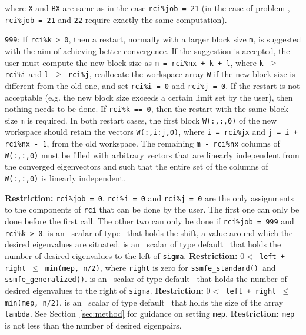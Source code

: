 \begin{description}
\begin{description}
where {\tt X} and {\tt BX} are same as in 
the case {\tt rci\%job = 21}
(in the case of problem ,
{\tt rci\%job = 21} and {\tt 22} 
require exactly the same computation).
%
\item
{\tt 999}: 
If {\tt rci\%k > 0}, then
a restart, normally with a larger block size {\tt m},
is suggested with the aim of achieving better convergence.
If the suggestion is accepted, the user must compute
the new block size as {\tt m = rci\%nx + k + l},
where {\tt k $\ge$ rci\%i} and {\tt l $\ge$ rci\%j},
reallocate the workspace array {\tt W}
if the new block size is different from the old one,
and set {\tt rci\%i = 0} and {\tt rci\%j = 0}.
If the restart is not acceptable
(e.g. the new block size exceeds a certain limit set by the user), 
then nothing needs to be done.
If {\tt rci\%k == 0}, then
the restart with the same block size {\tt m} is required.
In both restart cases,
the first block {\tt W(:,:,0)} of the new
workspace should retain the vectors 
{\tt W(:,i:j,0)},
where {\tt i = rci\%jx} and {\tt j = i + rci\%nx - 1},
from the old workspace.
The remaining {\tt m - rci\%nx} columns of {\tt W(:,:,0)}
must be filled
with arbitrary vectors that are linearly independent from 
the converged eigenvectors and such that
the entire set of the columns of {\tt W(:,:,0)}
is linearly independent.
%
\end{description}
%
{\bf Restriction:} 
{\tt rci\%job = 0}, 
{\tt rci\%i = 0} and
{\tt rci\%j = 0} 
are the only %
assignments to the components of {\tt rci}
that can be done
by the user.
The first one can only be done before the first call.
The other two can only be done if
{\tt rci\%job = 999} and {\tt rci\%k > 0}.
%
is an \intentin\ scalar of type \REALDP\
that holds the shift, 
a value around which the desired eigenvalues %
are situated.
%
 is an \intentin\ scalar of type default \Integer\ 
that holds the number of desired eigenvalues to the left of {\tt sigma}.
{\bf Restriction:} {\tt $0 < $ left + right $\le$ min(mep, n/2)},
where {\tt right} is zero for {\tt ssmfe\_standard()}\ and 
{\tt ssmfe\_generalized()}.
%
is an \intentin\ scalar of type default \Integer\ 
that holds the number of desired eigenvalues to the right of {\tt sigma}.
{\bf Restriction:} {\tt $0 < $ left + right $\le$ min(mep, n/2)}.
%
\itt{mep} is an \intentin\ scalar of type default \Integer\ 
that holds the size of the array {\tt lambda}.
See Section~\ref{sec:method} for guidance on
setting {\tt mep}.
{\bf Restriction:} 
{\tt mep} is not less than the number of desired eigenpairs.

\end{description}
